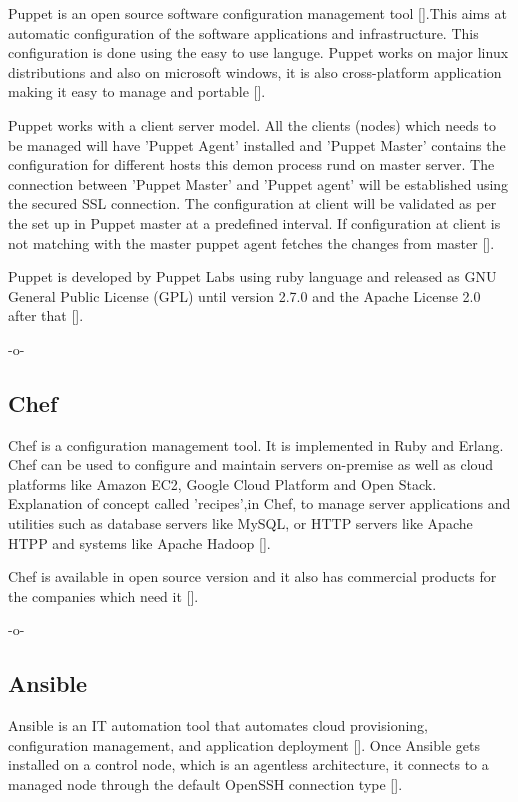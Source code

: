 Puppet is an open source software configuration management
tool [\cite{www-puppet-wiki-puppet}].This aims at automatic
configuration of the software applications and infrastructure. This
configuration is done using the easy to use languge.  Puppet works on
major linux distributions and also on microsoft windows, it is also
cross-platform application making it easy to manage and
portable [\cite{www-puppet-puppet-site}].

Puppet works with a client server model. All the clients (nodes)
which needs to be managed will have 'Puppet Agent' installed and
'Puppet Master' contains the configuration for different hosts this
demon process rund on master server. The connection between 'Puppet
Master' and 'Puppet agent' will be established using the secured SSL
connection. The configuration at client will be validated as per the
set up in Puppet master at a predefined interval. If configuration at
client is not matching with the master puppet agent fetches the
changes from master [\cite{www-puppet-slashroot}].

Puppet is developed by Puppet Labs using ruby language and released as
GNU General Public License (GPL) until version 2.7.0 and the Apache
License 2.0 after that [\cite{www-puppet-wiki-puppet}].

     -o-
  
\subsection{Chef}

Chef is a configuration management tool. It is implemented in Ruby and
Erlang. Chef can be used to configure and maintain servers on-premise
as well as cloud platforms like Amazon EC2, Google Cloud Platform and
Open Stack. Explanation of concept called 'recipes',in Chef, to
manage server applications and utilities such as database servers like
MySQL, or HTTP servers like Apache HTPP and systems like Apache
Hadoop [\cite{chef-book}].

Chef is available in open source version and it also has commercial
products for the companies which need it [\cite{www-chef-commercial}].

     -o-

\subsection{Ansible}

Ansible is an IT automation tool that automates cloud provisioning,
configuration management, and application
deployment [\cite{www-ansible}]. Once Ansible gets installed on a
control node, which is an agentless architecture, it connects to a
managed node through the default OpenSSH connection
type [\cite{www-ansible-wikipedia}].

